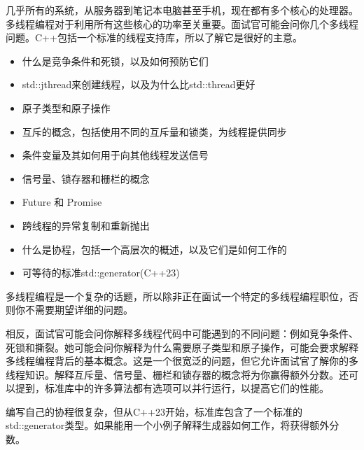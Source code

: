 
几乎所有的系统，从服务器到笔记本电脑甚至手机，现在都有多个核心的处理器。多线程编程对于利用所有这些核心的功率至关重要。面试官可能会问你几个多线程问题。C++包括一个标准的线程支持库，所以了解它是很好的主意。


\begin{itemize}
\item
什么是竞争条件和死锁，以及如何预防它们

\item
std::jthread来创建线程，以及为什么比std::thread更好

\item
原子类型和原子操作

\item
互斥的概念，包括使用不同的互斥量和锁类，为线程提供同步

\item
条件变量及其如何用于向其他线程发送信号

\item
信号量、锁存器和栅栏的概念

\item
Future 和 Promise

\item
跨线程的异常复制和重新抛出

\item
什么是协程，包括一个高层次的概述，以及它们是如何工作的

\item
可等待的标准std::generator(C++23)
\end{itemize}


多线程编程是一个复杂的话题，所以除非正在面试一个特定的多线程编程职位，否则你不需要期望详细的问题。

相反，面试官可能会问你解释多线程代码中可能遇到的不同问题：例如竞争条件、死锁和撕裂。她可能会问你解释为什么需要原子类型和原子操作，可能会要求解释多线程编程背后的基本概念。这是一个很宽泛的问题，但它允许面试官了解你的多线程知识。解释互斥量、信号量、栅栏和锁存器的概念将为你赢得额外分数。还可以提到，标准库中的许多算法都有选项可以并行运行，以提高它们的性能。

编写自己的协程很复杂，但从C++23开始，标准库包含了一个标准的std::generator类型。如果能用一个小例子解释生成器如何工作，将获得额外分数。

